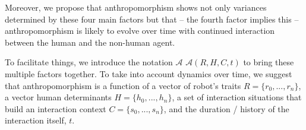 \documentclass{frontiersSCNS} %
\newcommand{\Ant}[1][]{%
      \ifthenelse{\isempty{#1}}%
        {$\mathcal{A}$}
        {$\mathcal{A}(#1)$}
}
\begin{document}
Moreover, we propose that anthropomorphism shows not only variances determined by these four main factors but that -- the fourth factor implies this -- anthropomorphism is likely to evolve over time with continued interaction between the human and the non-human agent.

To facilitate things, we introduce the notation \Ant[R,H,C,t] to bring these multiple factors together. To take into account dynamics over time, we suggest that
anthropomorphism is a function of a vector of robot's traits $R = \{r_0,...,r_n\}$, a vector human
determinants $H = \{h_0,...,h_n\}$, a set of interaction situations that build
an interaction context $C = \{s_0,...,s_n\}$, and the duration / history of the
interaction itself, $t$.





%
%
%
%
%
%
%
%
%
\end{document}
